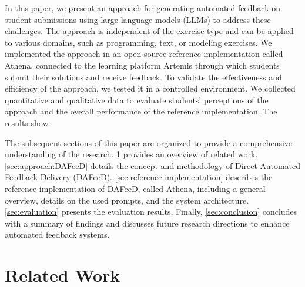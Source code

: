 \documentclass[manuscript,screen,review]{acmart}
\begin{document}
In this paper, we present an approach for generating automated feedback on student submissions using large language models (LLMs) to address these challenges.
The approach is independent of the exercise type and can be applied to various domains, such as programming, text, or modeling exercises.
We implemented the approach in an open-source reference implementation called Athena, connected to the learning platform Artemis through which students submit their solutions and receive feedback.
To validate the effectiveness and efficiency of the approach, we tested it in a controlled environment. 
We collected quantitative and qualitative data to evaluate students' perceptions of the approach and the overall performance of the reference implementation.
The results show %


The subsequent sections of this paper are organized to provide a comprehensive understanding of the research. 
\cref{sec:related-work} provides an overview of related work. 
\cref{sec:approach:DAFeeD} details the concept and methodology of Direct Automated Feedback Delivery (DAFeeD).
\cref{sec:reference-implementation} describes the reference implementation of DAFeeD, called Athena, including a general overview, details on the used prompts, and the system architecture. 
\cref{sec:evaluation} presents the evaluation results, %
Finally, \cref{sec:conclusion} concludes with a summary of findings and discusses future research directions to enhance automated feedback systems.

\newpage
\section{Related Work} %
\label{sec:related-work}
\end{document}
